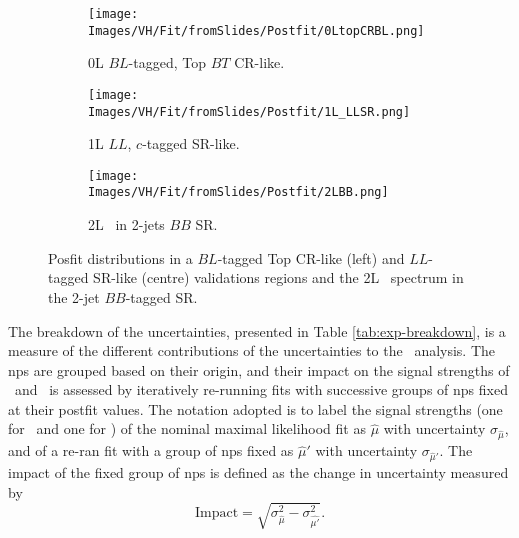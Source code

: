 \begin{figure}[h!]
    \centering
    \begin{subfigure}[b]{0.32\textwidth}
        \centering
        \texttt{[image: Images/VH/Fit/fromSlides/Postfit/0LtopCRBL.png]}
        \caption{0L $BL$-tagged, Top $BT$ CR-like.}
        \label{fig:val_BLtopCR}
    \end{subfigure}
    \begin{subfigure}[b]{0.32\textwidth}
        \centering
        \texttt{[image: Images/VH/Fit/fromSlides/Postfit/1L\_LLSR.png]}
        \caption{1L $LL$, $c$-tagged SR-like.}
        \label{fig:val_LLSR}
    \end{subfigure}
    \begin{subfigure}[b]{0.32\textwidth}
      \centering
      \texttt{[image: Images/VH/Fit/fromSlides/Postfit/2LBB.png]}
      \caption{2L \ptv\ in 2-jets $BB$ SR.}
      \label{fig:fit_ptv2L}
    \end{subfigure} 
    \caption{Posfit distributions in a $BL$-tagged Top CR-like (left) and $LL$-tagged SR-like (centre) validations regions and the 2L \ptv\ spectrum in the 2-jet $BB$-tagged SR.}
    \label{fig:postfitval}
\end{figure} 


The breakdown of the uncertainties, presented in Table \ref{tab:exp-breakdown}, is a measure of the different contributions of the uncertainties to the \vhbc\ analysis. The \gls{np}s are grouped based on their origin, and their impact on the signal strengths of \vhb\ and \vhc\ is assessed by iteratively re-running fits with successive groups of \gls{np}s fixed at their postfit values. The notation adopted is to label the signal strengths (one for \vhb\ and one for \vhc) of the nominal maximal likelihood fit as $\hat{\mu}$ with uncertainty $\sigma_{\hat{\mu}}$, and of a re-ran fit with a group of \gls{np}s fixed as $\hat{\mu}'$ with uncertainty $\sigma_{\hat{\mu}'}$. The impact of the fixed group of \gls{np}s is defined as the change in uncertainty measured by 
\begin{equation}
    \text{Impact} = \sqrt{\sigma^2_{\hat{\mu}} - \sigma^2_{\hat{\mu'}}}.
\end{equation}

